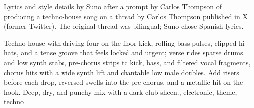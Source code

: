 

\begin{notes}
Lyrics and style details by Suno after a prompt by Carlos Thompson of producing a techno-house song on a thread by Carlos Thompson published in X (former Twitter). %
The original thread was bilingual; Suno chose Spanish lyrics.
\end{notes}

\begin{style}
Techno-house with driving four-on-the-floor kick, rolling bass pulses, clipped hi-hats, and a tense groove that feels locked and urgent; verse rides sparse drums and low synth stabs, pre-chorus strips to kick, bass, and filtered vocal fragments, chorus hits with a wide synth lift and chantable low male doubles. %
Add risers before each drop, reversed swells into the pre-chorus, and a metallic hit on the hook. %
Deep, dry, and punchy mix with a dark club sheen., electronic, theme, techno
\end{style}

